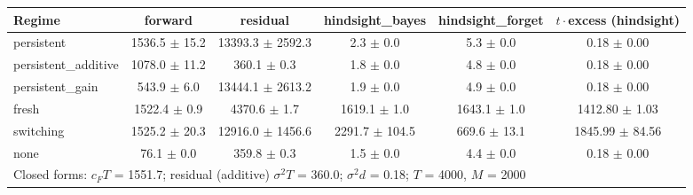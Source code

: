 \begin{tabular}{lccccc}
\toprule
Regime & forward & residual & hindsight\_bayes & hindsight\_forget & $t\cdot$excess (hindsight) \\
\midrule
persistent & 1536.5 $\pm$ 15.2 & 13393.3 $\pm$ 2592.3 & 2.3 $\pm$ 0.0 & 5.3 $\pm$ 0.0 & 0.18 $\pm$ 0.00 \\
persistent\_additive & 1078.0 $\pm$ 11.2 & 360.1 $\pm$ 0.3 & 1.8 $\pm$ 0.0 & 4.8 $\pm$ 0.0 & 0.18 $\pm$ 0.00 \\
persistent\_gain & 543.9 $\pm$ 6.0 & 13444.1 $\pm$ 2613.2 & 1.9 $\pm$ 0.0 & 4.9 $\pm$ 0.0 & 0.18 $\pm$ 0.00 \\
fresh & 1522.4 $\pm$ 0.9 & 4370.6 $\pm$ 1.7 & 1619.1 $\pm$ 1.0 & 1643.1 $\pm$ 1.0 & 1412.80 $\pm$ 1.03 \\
switching & 1525.2 $\pm$ 20.3 & 12916.0 $\pm$ 1456.6 & 2291.7 $\pm$ 104.5 & 669.6 $\pm$ 13.1 & 1845.99 $\pm$ 84.56 \\
none & 76.1 $\pm$ 0.0 & 359.8 $\pm$ 0.3 & 1.5 $\pm$ 0.0 & 4.4 $\pm$ 0.0 & 0.18 $\pm$ 0.00 \\
\midrule
\multicolumn{6}{l}{Closed forms: $c_F T$ = 1551.7; residual (additive) $\sigma^2 T$ = 360.0; $\sigma^2 d$ = 0.18; $T$ = 4000, $M$ = 2000} \\
\bottomrule
\end{tabular}
